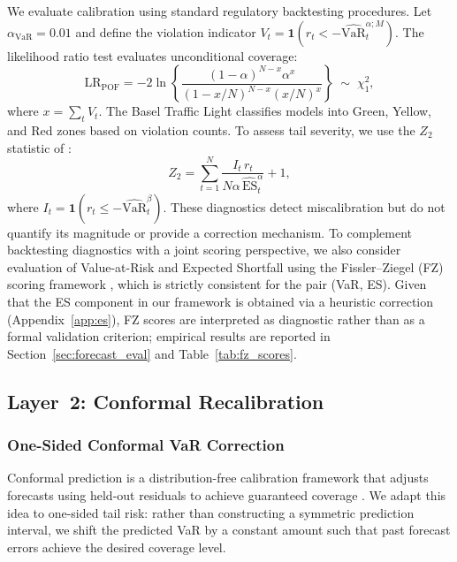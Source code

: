 \documentclass[preprint,11pt,authoryear]{elsarticle}
\newcommand{\VaR}{\mathrm{VaR}}
\newcommand{\ES}{\mathrm{ES}}
\newcommand{\1}{\boldsymbol{1}}
\begin{document}
	We evaluate calibration using standard regulatory backtesting
	procedures. Let $\alpha_{\mathrm{VaR}} = 0.01$ and define the
	violation indicator
	$V_t = \1(r_t < -\widehat{\VaR}_t^{\alpha;M})$. The
	\citet{kupiec1995} likelihood ratio test evaluates
	unconditional coverage:
	\begin{equation}
		\label{eq:kupiec}
		\mathrm{LR}_{\mathrm{POF}} = -2\ln\!\left\{
		\frac{(1-\alpha)^{N-x}\alpha^x}
		{(1-x/N)^{N-x}(x/N)^x}\right\}
		\;\sim\; \chi^2_1,
	\end{equation}
	where $x = \sum_t V_t$. The Basel Traffic Light
	\citep{basel1996} classifies models into Green, Yellow, and
	Red zones based on violation counts. To assess tail severity,
	we use the $Z_2$ statistic of \citet{acerbi2014back}:
	\begin{equation}
		\label{eq:Z2}
		Z_2 = \sum_{t=1}^N
		\frac{I_t\, r_t}{N\alpha\,\widehat{\ES}_t^\alpha} + 1,
	\end{equation}
	where $I_t = \1(r_t \leq -\widehat{\VaR}_t^\beta)$. These
	diagnostics detect miscalibration but do not quantify its
	magnitude or provide a correction mechanism.
	To complement backtesting diagnostics with a joint scoring perspective, we also consider evaluation of Value-at-Risk and Expected Shortfall using the Fissler--Ziegel (FZ) scoring framework \citep{fissler2016higher}, which is strictly consistent for the pair (VaR, ES). Given that the ES component in our framework is obtained via a heuristic correction (Appendix~\ref{app:es}), FZ scores are interpreted as diagnostic rather than as a formal validation criterion; empirical results are reported in Section~\ref{sec:forecast_eval} and Table~\ref{tab:fz_scores}.

	\subsection{Layer~2: Conformal Recalibration}
	\label{sec:layer2}
	
	\subsubsection{One-Sided Conformal VaR Correction}
	\label{sec:cqr_var}
	
	Conformal prediction is a distribution-free calibration
	framework that adjusts forecasts using held-out residuals to
	achieve guaranteed coverage
	\citep{vovk2005algorithmic, romano2019conformalized}. We
	adapt this idea to one-sided tail risk: rather than
	constructing a symmetric prediction interval, we shift the
	predicted VaR by a constant amount such that past forecast
	errors achieve the desired coverage level.
	
\end{document}
